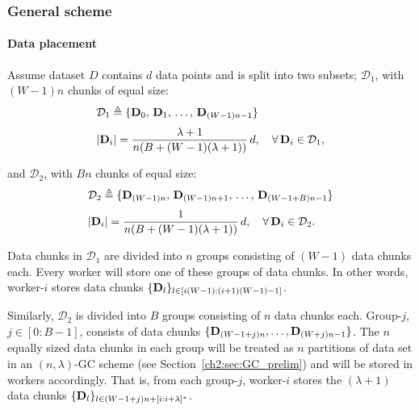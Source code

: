 \subsubsection{General scheme}\label{ch2:sec:b_sgc_general}

\paragraph{Data placement} Assume dataset $D$ contains $d$ data points and is split into two subsets; $\mathcal{D}_1$, with $(W - 1)n$ chunks of equal size:
\begin{align}
    &\mathcal{D}_1 \triangleq \{ \mathbf{D}_0, \, \mathbf{D}_1, \, \ldots, \, \mathbf{D}_{(W-1)n-1} \} \\[3pt]
    &|\mathbf{D}_i| = \frac{\lambda+1}{n(B+(W-1)(\lambda+1))} \, d, \ \ \ \forall \, \mathbf{D}_i\in\mathcal{D}_1,
\end{align}

and $\mathcal{D}_2$, with $Bn$ chunks of equal size:
\begin{align}
    &\mathcal{D}_2 \triangleq \{ \mathbf{D}_{(W-1)n}, \, \mathbf{D}_{(W-1)n+1}, \, \ldots, \, \mathbf{D}_{(W-1+B)n-1} \} \\[3pt]
    &|\mathbf{D}_i| = \frac{1}{n(B+(W-1)(\lambda+1))} \, d, \ \ \ \forall \, \mathbf{D}_i\in\mathcal{D}_2.
\end{align}
    

Data chunks in $\mathcal{D}_1$ are divided into $n$ groups consisting of $(W-1)$ data chunks each. Every worker will store one of these groups of data chunks. In other words, worker-$i$ stores data chunks $\{\mathbf{D}_l\}_{l\in[i(W-1):(i+1)(W-1)-1]}$.

Similarly, $\mathcal{D}_2$ is divided into $B$ groups consisting of $n$ data chunks each. Group-$j$, $j\in[0:B-1]$, consists of data chunks $\{\mathbf{D}_{(W-1+j)n},\ldots,\mathbf{D}_{(W+j)n-1}\}$. The $n$ equally sized data chunks in each group will be treated as $n$ partitions of data set in an $(n,\lambda)$-GC scheme (see Section~\ref{ch2:sec:GC_prelim}) and will be stored in workers accordingly. That is, from each group-$j$, worker-$i$ stores the $(\lambda+1)$ data chunks $\{\mathbf{D}_l\}_{l\in(W-1+j)n+[i:i+\lambda]^*}$.

